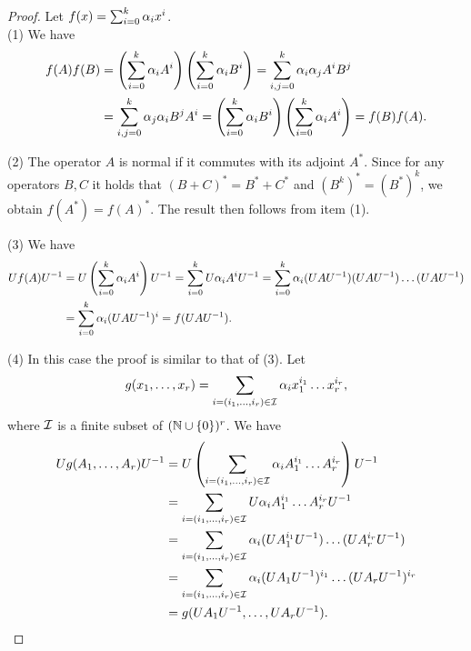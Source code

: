 \documentclass[11pt,letter]{article}
\begin{document}
\begin{proof}
Let $f(x)=\sum_{i=0}^k\alpha_ix^i$.\\[2mm]
(1) We have
\begin{align*}
f(A)f(B) &=\left(\sum_{i=0}^k\alpha_iA^i\right)\left(\sum_{i=0}^k\alpha_iB^i\right)=\sum_{i,j=0}^k\alpha_i\alpha_jA^iB^j\\
&=\sum_{i,j=0}^k\alpha_j\alpha_iB^jA^i=\left(\sum_{i=0}^k\alpha_iB^i\right)\left(\sum_{i=0}^k\alpha_iA^i\right)=f(B)f(A).
\end{align*}

\noindent
(2) The operator $A$ is normal if it commutes with its 
adjoint $A^*$. Since for any operators $B,C$ it holds that $(B+C)^*=B^*+C^*$ and $(B^k)^*=(B^*)^k$, we obtain $f(A^*)=f(A)^*$. The result then follows from item (1).

\noindent
(3) We have
\begin{align*}
Uf(A)U^{-1} &=U\left(\sum_{i=0}^k\alpha_iA^i\right)U^{-1} =\sum_{i=0}^kU\alpha_iA^iU^{-1} =\sum_{i=0}^k\alpha_i(UAU^{-1})(UAU^{-1})\dots(UAU^{-1})\\ 
&=\sum_{i=0}^k\alpha_i(UAU^{-1})^i=f(UAU^{-1}).
\end{align*}

\noindent
(4) In this case the proof is similar to that of (3). Let
\[
g(x_1,\dots,x_r)=\sum_{i=(i_1,\dots,i_r)\in\cal I}\alpha_ix_1^{i_1}\dots x_r^{i_r},
\]
where ${\mathcal I}$ is a finite subset of $({\mathbb N}\cup\{0\})^r$. We have
\begin{align*}
Ug(A_1,\dots,A_r)U^{-1} &=U\left(\sum_{i=(i_1,\dots,i_r)\in\cal I}\alpha_iA_1^{i_1}\dots A_r^{i_r}\right)U^{-1}\\
&=\sum_{i=(i_1,\dots,i_r)\in\cal I}U\alpha_iA_1^{i_1}\dots A_r^{i_r}U^{-1}\\ 
&=\sum_{i=(i_1,\dots,i_r)\in\cal I}\alpha_i(UA_1^{i_1}U^{-1})\dots(UA_r^{i_r}U^{-1})\\ 
&=\sum_{i=(i_1,\dots,i_r)\in\cal I}\alpha_i(UA_1U^{-1})^{i_1}\dots(UA_rU^{-1})^{i_r}\\
&=g(UA_1U^{-1},\dots,UA_rU^{-1}).
\end{align*}
\end{proof}
\end{document}
